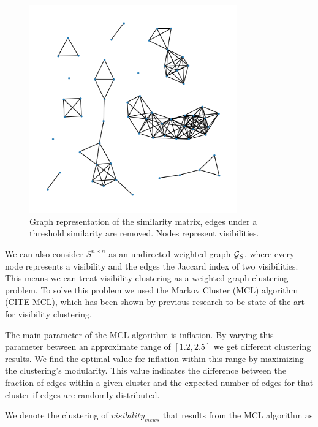 \begin{figure}[h]
    \centering
    \includegraphics*[width=0.8\textwidth]{./fig/mutual_visibility_graph.png}
    \caption{Graph representation of the similarity matrix, edges under a threshold similarity are removed. Nodes represent visibilities.}
    \label{fig:similarity_graph}
\end{figure}

We can also consider \(S^{n \times n}\) as an undirected weighted graph \(\mathcal{G}_S\), where every node represents a visibility and the edges the Jaccard index of two visibilities. This means we can treat visibility clustering as a weighted graph clustering problem. To solve this problem we used the Markov Cluster (MCL) algorithm (CITE MCL), which has been shown by previous research to be state-of-the-art for visibility clustering. 


The main parameter of the MCL algorithm is inflation. By varying this parameter between an approximate range of \([1.2, 2.5]\) we get different clustering results. We find the optimal value for inflation within this range by maximizing the clustering's modularity. This value indicates the difference between the fraction of edges within a given cluster and the expected number of edges for that cluster if edges are randomly distributed. 


We denote the clustering of \(visibility_{views}\) that results from the MCL algorithm as 

